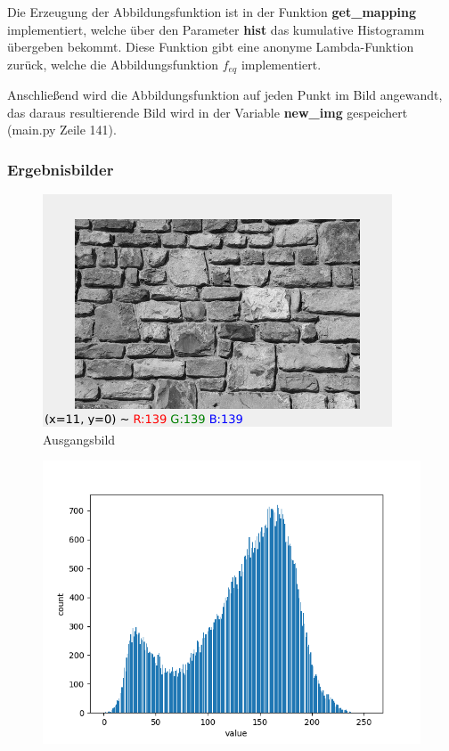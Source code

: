 \documentclass[12pt]{article}
\begin{document}
Die Erzeugung der Abbildungsfunktion ist in der Funktion \textbf{get\_mapping} implementiert, welche über den Parameter \textbf{hist} das kumulative Histogramm übergeben bekommt. Diese Funktion gibt eine anonyme Lambda-Funktion zurück, welche die Abbildungsfunktion $f_{eq}$ implementiert.

Anschließend wird die Abbildungsfunktion auf jeden Punkt im Bild angewandt, das daraus resultierende Bild wird in der Variable \textbf{new\_img} gespeichert (main.py Zeile 141).

\newpage

\subsubsection*{Ergebnisbilder}
\begin{figure}[h]
  \centering
  \begin{minipage}{0.32\textwidth}
    \centering
    \includegraphics[width=\textwidth]{ausgangsbild.png}
    Ausgangsbild
  \end{minipage}
  \hfill
  \begin{minipage}{0.32\textwidth}
    \centering
    \includegraphics[width=\textwidth]{ausgangsbild_histogramm.png}

\end{minipage}
\end{figure}
\end{document}
